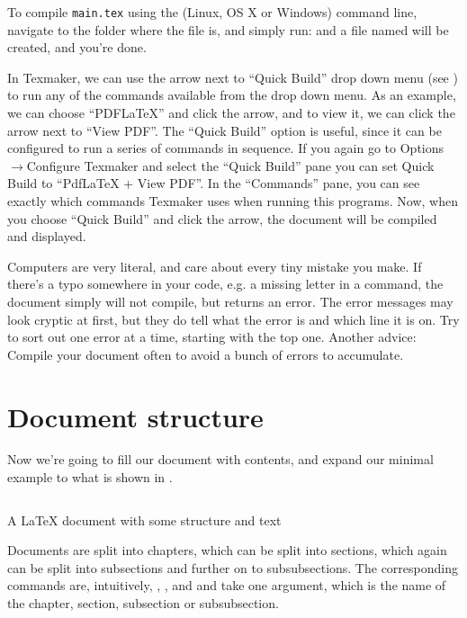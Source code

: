 To compile \texttt{main.tex} using the (Linux, OS X or Windows) command line, navigate to the folder where the file is, and simply run:
and a file named  will be created, and you're done.

In Texmaker, we can use the arrow next to ``Quick Build'' drop down menu (see ) to run any of the commands available from the drop down menu. As an example, we can choose ``PDFLaTeX'' and click the arrow, and to view it, we can click the arrow next to ``View PDF''. The ``Quick Build'' option is useful, since it can be configured to run a series of commands in sequence. If you again go to Options$\rightarrow$Configure Texmaker and select the ``Quick Build'' pane you can set Quick Build to ``PdfLaTeX + View PDF''. In the ``Commands'' pane, you can see exactly which commands Texmaker uses when running this programs. Now, when you choose ``Quick Build'' and click the arrow, the document will be compiled and displayed.

Computers are very literal, and care about every tiny mistake you make. If there's a typo somewhere in your code, e.g. a missing letter in a command, the document simply will not compile, but returns an error. The error messages may look cryptic at first, but they do tell what the error is and which line it is on. Try to sort out one error at a time, starting with the top one. Another advice: Compile your document often to avoid a bunch of errors to accumulate.

\section{Document structure}
Now we're going to fill our document with contents, and expand our minimal example to what is shown in .
\begin{listing}
	\inputminted{latex}{latex/structure.tex}
	\caption{A \LaTeX{} document with some structure and text}
	\label{lst:latex:structure}
\end{listing}

Documents are split into chapters, which can be split into sections, which again can be split into subsections and further on to subsubsections. The corresponding commands are, intuitively, , \latexin{\section}, \latexin{\subsection} and \latexin{\subsubsection} and take one argument, which is the name of the chapter, section, subsection or subsubsection.


